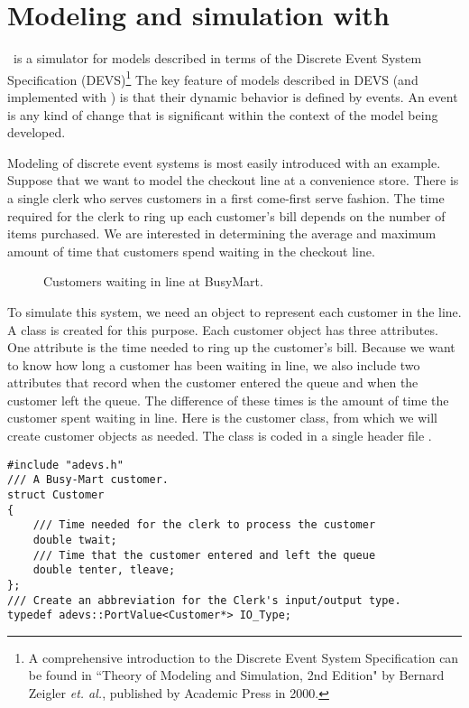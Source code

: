 \chapter{Modeling and simulation with \adevs}
\label{chapter:intro}
\adevs\ is a simulator for models described in terms of the Discrete Event System Specification (DEVS)\footnote{A comprehensive introduction to the Discrete Event System Specification can be found in ``Theory of Modeling and Simulation, 2nd Edition" by Bernard Zeigler \textit{et. al.}, published by Academic Press in 2000.} The key feature of models described in DEVS (and implemented with \adevs) is that their dynamic behavior is defined by events. An event is any kind of change that is significant within the context of the model being developed.

Modeling of discrete event systems is most easily introduced with an example. Suppose that we want to model the checkout line at a convenience store. There is a single clerk who serves customers in a first come-first serve fashion. The time required for the clerk to ring up each customer's bill depends on the number of items purchased. We are interested in determining the average and maximum amount of time that customers spend waiting in the checkout line.
\begin{figure}[ht]
\centering
{}
\caption{Customers waiting in line at BusyMart.}
\label{fig:busy_mart}
\end{figure}

To simulate this system, we need an object to represent each customer in the line. A  class is created for this purpose. Each customer object has three attributes. One attribute is the time needed to ring up the customer's bill. Because we want to know how long a customer has been waiting in line, we also include two attributes that record when the customer entered the queue and when the customer left the queue. The difference of these times is the amount of time the customer spent waiting in line. Here is the customer class, from which we will create customer objects as needed. The class is coded in a single header file .
\begin{verbatim}
#include "adevs.h"
/// A Busy-Mart customer.
struct Customer
{
    /// Time needed for the clerk to process the customer
    double twait;
    /// Time that the customer entered and left the queue
    double tenter, tleave;
};
/// Create an abbreviation for the Clerk's input/output type.
typedef adevs::PortValue<Customer*> IO_Type;
\end{verbatim}

